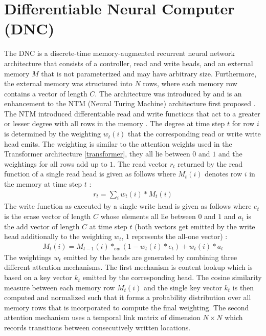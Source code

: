 \documentclass[draft,final]{vutinfth} %
\begin{document}
    \section{Differentiable Neural Computer (DNC)} \label{dnc}
    The DNC is a discrete-time memory-augmented recurrent neural network architecture that consists of a controller, read and write heads, and an external memory $M$ that is not parameterized and may have arbitrary size.
    Furthermore, the external memory was structured into $N$ rows, where each memory row contains a vector of length $C$.
    The architecture was introduced by \cite{DNC} and is an enhancement to the NTM (Neural Turing Machine) architecture first proposed \cite{NTM}.
    The NTM introduced differentiable read and write functions that act to a greater or lesser degree with all rows in the memory \cite[p. 5]{NTM}.
    The degree at time step $t$ for row $i$ is determined by the weighting $w_t(i)$ that the corresponding read or write write head emits.
    The weighting is similar to the attention weights used in the Transformer architecture \ref{transformer}, they all lie between $0$ and $1$ and the weightings for all rows add up to $1$.
    The read vector $r_t$ returned by the read function of a single read head is given as follows where $M_t(i)$ denotes row $i$ in the memory at time step $t$ \cite[p. 1]{DNC}:
    \begin{align}
    \label{dnc_read}
    r_t = \sum_i{w_t(i) * M_t(i)}
    \end{align}
    The write function as executed by a single write head is given as follows where $e_t$ is the erase vector of length $C$ whose elements all lie between $0$ and $1$ and $a_t$ is the add vector of length $C$ at time step $t$ (both vectors get emitted by the write head additionally to the weighting $w_t$, $1$ represents the all-one vector) \cite[p. 1]{DNC}:
    \begin{align}
    \label{dnc_write}
    M_t(i) = M_{t-1}(i) *_{ew} (1 - w_t(i) * e_t) + w_t(i) * a_t
    \end{align}
    The weightings $w_t$ emitted by the heads are generated by combining three different attention mechanisms. 
    The first mechanism is content lookup which is based on a key vector $k_t$ emitted by the corresponding head.
    The cosine similarity measure between each memory row $M_t(i)$ and the single key vector $k_t$ is then computed and normalized such that it forms a probability distribution over all memory rows that is incorporated to compute the final weighting. 
    The second attention mechanism uses a temporal link matrix of dimension $N \times N$ which records transitions between consecutively written locations.
\end{document}
